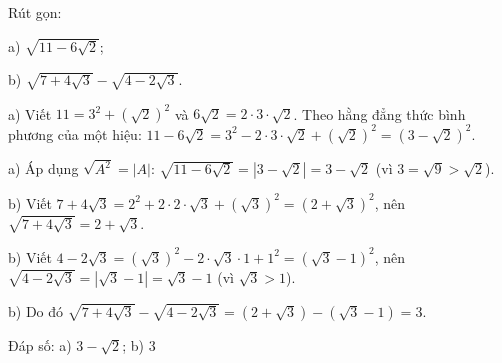 \begin{problem}[9DS-CAN-044]
Rút gọn:

a) $\sqrt{11 - 6\sqrt{2}}$;

b) $\sqrt{7 + 4\sqrt{3}} - \sqrt{4 - 2\sqrt{3}}$.

\begin{solution}
a) Viết $11 = 3^2 + (\sqrt{2})^2$ và $6\sqrt{2} = 2 \cdot 3 \cdot \sqrt{2}$. Theo hằng đẳng thức bình phương của một hiệu: $11 - 6\sqrt{2} = 3^2 - 2 \cdot 3 \cdot \sqrt{2} + (\sqrt{2})^2 = (3 - \sqrt{2})^2$.

a) Áp dụng $\sqrt{A^2} = |A|$: $\sqrt{11 - 6\sqrt{2}} = |3 - \sqrt{2}| = 3 - \sqrt{2}$ (vì $3 = \sqrt{9} > \sqrt{2}$).

b) Viết $7 + 4\sqrt{3} = 2^2 + 2 \cdot 2 \cdot \sqrt{3} + (\sqrt{3})^2 = (2 + \sqrt{3})^2$, nên $\sqrt{7 + 4\sqrt{3}} = 2 + \sqrt{3}$.

b) Viết $4 - 2\sqrt{3} = (\sqrt{3})^2 - 2 \cdot \sqrt{3} \cdot 1 + 1^2 = (\sqrt{3} - 1)^2$, nên $\sqrt{4 - 2\sqrt{3}} = |\sqrt{3} - 1| = \sqrt{3} - 1$ (vì $\sqrt{3} > 1$).

b) Do đó $\sqrt{7 + 4\sqrt{3}} - \sqrt{4 - 2\sqrt{3}} = (2 + \sqrt{3}) - (\sqrt{3} - 1) = 3$.

Đáp số: a) $\boxed{3 - \sqrt{2}}$; b) $\boxed{3}$
\end{solution}
\end{problem}

